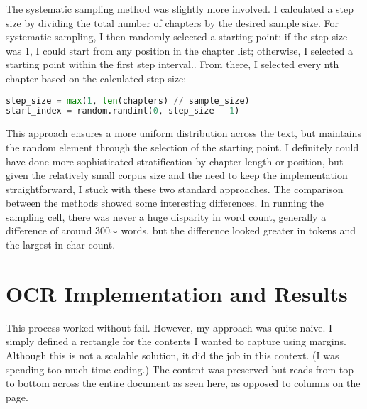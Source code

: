 \documentclass[12pt]{article}
\begin{document}
The systematic sampling method was slightly more involved. I calculated a step size by dividing the total number of chapters by the desired sample size. For systematic sampling, I then randomly selected a starting point: if the step size was 1, I could start from any position in the chapter list; otherwise, I selected a starting point within the first step interval.. From there, I selected every nth chapter based on the calculated step size:

\begin{lstlisting}[language=Python]
step_size = max(1, len(chapters) // sample_size)
start_index = random.randint(0, step_size - 1)
\end{lstlisting}

This approach ensures a more uniform distribution across the text, but maintains the random element through the selection of the starting point. I definitely could have done more sophisticated stratification by chapter length or position, but given the relatively small corpus size and the need to keep the implementation straightforward, I stuck with these two standard approaches. The comparison between the methods showed some interesting differences. In running the sampling cell, there was never a huge disparity in word count, generally a difference of around 300$\sim$ words, but the difference looked greater in tokens and the largest in char count.

\section*{OCR Implementation and Results}

This process worked without fail. However, my approach was quite naive. I simply defined a rectangle for the contents I wanted to capture using margins. Although this is not a scalable solution, it did the job in this context. (I was spending too much time coding.) The content was preserved but reads from top to bottom across the entire document as seen \href{https://github.com/marobinette/NaturalLanguageProcessing/blob/main/hw/week_4/OCR_me_electricalengineering_processed.txt}{here}, as opposed to columns on the page.
\end{document}
